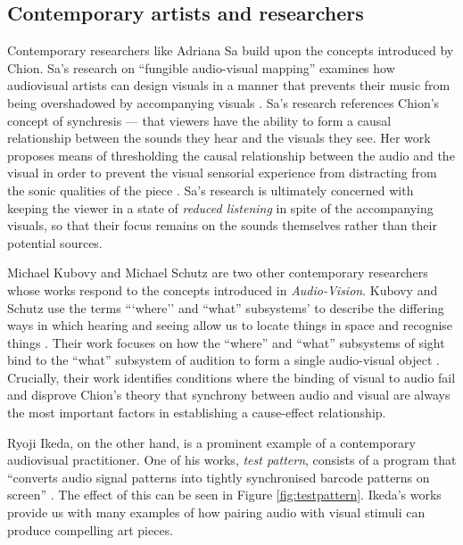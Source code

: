 \documentclass[../initial_thesis.tex]{subfiles}
\begin{document}
\subsection{Contemporary artists and researchers} %
Contemporary researchers like Adriana Sa build upon the concepts introduced by Chion. Sa's research on ``fungible audio-visual mapping'' examines how audiovisual artists can design visuals in a manner that prevents their music from being overshadowed by accompanying visuals \cite{Sa2014}. Sa's research references Chion's concept of synchresis --- that viewers have the ability to form a causal relationship between the sounds they hear and the visuals they see. Her work proposes means of thresholding the causal relationship between the audio and the visual in order to prevent the visual sensorial experience from distracting from the sonic qualities of the piece \cite{Sa2013}. Sa's research is ultimately concerned with keeping the viewer in a state of \emph{reduced listening} in spite of the accompanying visuals, so that their focus remains on the sounds themselves rather than their potential sources. \par

Michael Kubovy and Michael Schutz are two other contemporary researchers whose works respond to the concepts introduced in \textit{Audio-Vision}. Kubovy and Schutz use the terms ```where'' and ``what'' subsystems' to describe the differing ways in which hearing and seeing allow us to locate things in space and recognise things \cite{Kubovy2010}. Their work focuses on how the ``where'' and ``what'' subsystems of sight bind to the ``what'' subsystem of audition to form a single audio-visual object \cite{Kubovy2010}. Crucially, their work identifies conditions where the binding of visual to audio fail and disprove Chion's theory that synchrony between audio and visual are always the most important factors in establishing a cause-effect relationship. \par

Ryoji Ikeda, on the other hand, is a prominent example of a contemporary audiovisual practitioner. One of his works, \textit{test pattern}, consists of a program that ``converts audio signal patterns into tightly synchronised barcode patterns on screen'' \cite{Ikeda}. The effect of this can be seen in Figure \ref{fig:testpattern}. Ikeda's works provide us with many examples of how pairing audio with visual stimuli can produce compelling art pieces. \par
\end{document}
